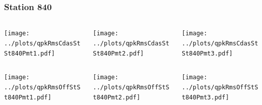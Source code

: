 \documentclass[aspectratio=169]{beamer}
\begin{document}
\begin{frame} 
  \frametitle{Station 840}
  \begin{center}
    \begin{columns}
      \begin{column}{0.33\textwidth}
        \texttt{[image: ../plots/qpkRmsCdasStSt840Pmt1.pdf]}
      \end{column}
      \begin{column}{0.33\textwidth}
        \texttt{[image: ../plots/qpkRmsCdasStSt840Pmt2.pdf]}
      \end{column}
      \begin{column}{0.33\textwidth}
        \texttt{[image: ../plots/qpkRmsCdasStSt840Pmt3.pdf]}
      \end{column}
    \end{columns}
  \end{center}

  \begin{center}
    \begin{columns}
      \begin{column}{0.33\textwidth}
        \texttt{[image: ../plots/qpkRmsOffStSt840Pmt1.pdf]}
      \end{column}
      \begin{column}{0.33\textwidth}
        \texttt{[image: ../plots/qpkRmsOffStSt840Pmt2.pdf]}
      \end{column}
      \begin{column}{0.33\textwidth}
        \texttt{[image: ../plots/qpkRmsOffStSt840Pmt3.pdf]}
      \end{column}
    \end{columns}
  \end{center}
\end{frame}
\end{document}

